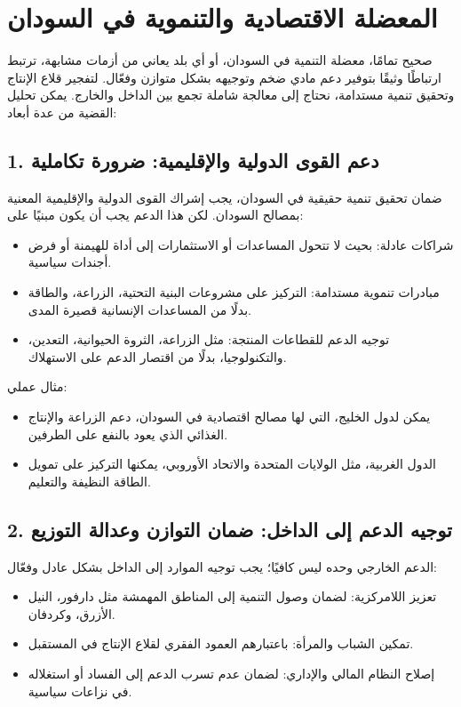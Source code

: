 \documentclass[12pt]{article}
\begin{document}
\section*{المعضلة الاقتصادية والتنموية في السودان}
صحيح تمامًا، معضلة التنمية في السودان، أو أي بلد يعاني من أزمات مشابهة، ترتبط ارتباطًا وثيقًا بتوفير دعم مادي ضخم وتوجيهه بشكل متوازن وفعّال. لتفجير قلاع الإنتاج وتحقيق تنمية مستدامة، نحتاج إلى معالجة شاملة تجمع بين الداخل والخارج. يمكن تحليل القضية من عدة أبعاد:

\subsection*{1. دعم القوى الدولية والإقليمية: ضرورة تكاملية}
ضمان تحقيق تنمية حقيقية في السودان، يجب إشراك القوى الدولية والإقليمية المعنية بمصالح السودان. لكن هذا الدعم يجب أن يكون مبنيًا على:
\begin{itemize}
    \item شراكات عادلة: بحيث لا تتحول المساعدات أو الاستثمارات إلى أداة للهيمنة أو فرض أجندات سياسية.
    \item مبادرات تنموية مستدامة: التركيز على مشروعات البنية التحتية، الزراعة، والطاقة بدلًا من المساعدات الإنسانية قصيرة المدى.
    \item توجيه الدعم للقطاعات المنتجة: مثل الزراعة، الثروة الحيوانية، التعدين، والتكنولوجيا، بدلًا من اقتصار الدعم على الاستهلاك.
\end{itemize}

مثال عملي:
\begin{itemize}
    \item يمكن لدول الخليج، التي لها مصالح اقتصادية في السودان، دعم الزراعة والإنتاج الغذائي الذي يعود بالنفع على الطرفين.
    \item الدول الغربية، مثل الولايات المتحدة والاتحاد الأوروبي، يمكنها التركيز على تمويل الطاقة النظيفة والتعليم.
\end{itemize}

\subsection*{2. توجيه الدعم إلى الداخل: ضمان التوازن وعدالة التوزيع}
الدعم الخارجي وحده ليس كافيًا؛ يجب توجيه الموارد إلى الداخل بشكل عادل وفعّال:
\begin{itemize}
    \item تعزيز اللامركزية: لضمان وصول التنمية إلى المناطق المهمشة مثل دارفور، النيل الأزرق، وكردفان.
    \item تمكين الشباب والمرأة: باعتبارهم العمود الفقري لقلاع الإنتاج في المستقبل.
    \item إصلاح النظام المالي والإداري: لضمان عدم تسرب الدعم إلى الفساد أو استغلاله في نزاعات سياسية.
\end{itemize}
\end{document}

